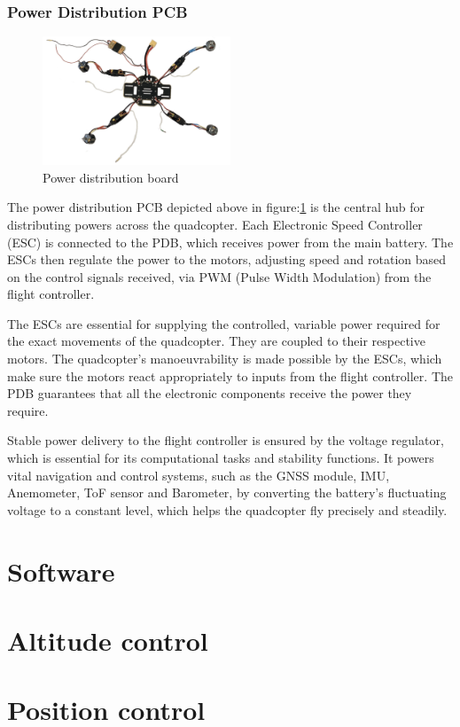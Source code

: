 \documentclass{article}
\begin{document}
\subsubsection{Power Distribution PCB}
\begin{figure}[H]
  \centering
  \includegraphics[width=0.5\textwidth]{Pictures/power_distribution_and_escs.png}
  \caption{Power distribution board}
  \label{fig:power_distribution}
\end{figure}
The power distribution PCB depicted above in figure:\ref{fig:power_distribution} is the central hub for distributing powers across the quadcopter. Each Electronic Speed Controller (ESC) is connected to the PDB, which receives power from the main battery. The ESCs then regulate the power to the motors, adjusting speed and rotation based on the 
control signals received, via PWM (Pulse Width Modulation) from the flight controller.

The ESCs are essential for supplying the controlled, variable power required for the exact movements of the quadcopter. They are coupled to their respective motors. The quadcopter's manoeuvrability is made possible by the ESCs, which make sure the motors react appropriately to inputs from the flight controller. The PDB guarantees that all 
the electronic components receive the power they require.

Stable power delivery to the flight controller is ensured by the voltage regulator, which is essential for its computational tasks and stability functions. It powers vital navigation and control systems, such as the GNSS module, IMU, Anemometer, ToF sensor and Barometer, by converting the battery's fluctuating voltage to a constant level, 
which helps the quadcopter fly precisely and steadily.
\section{Software}

\section{Altitude control}
\section{Position control}



\end{document}
